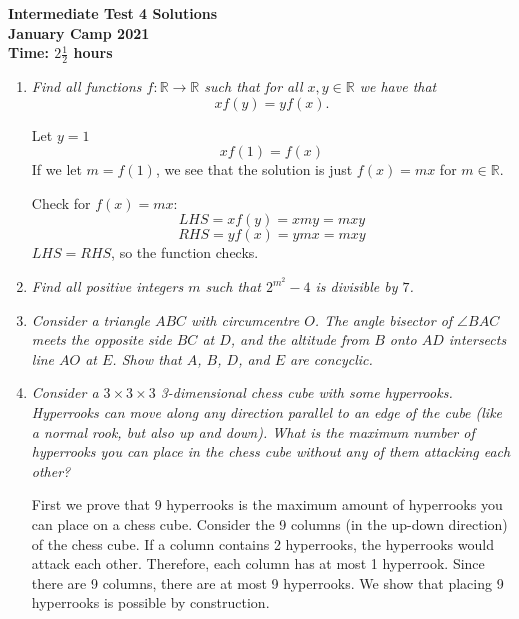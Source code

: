 \documentclass{article}
\begin{document}
\thispagestyle{empty}

\begin{center}
  \textbf{\Large Intermediate Test 4 Solutions}
  \\ \vspace{1em}
  \textbf{\large January Camp 2021}
  \\ \vspace{1em}
  \textbf{\large Time: $2\frac{1}{2}$ hours}
\end{center}

\vspace{24pt}

\begin{enumerate}[1.]

\item %
{\itshape Find all functions $f : \mathbb{R} \to \mathbb{R}$ such that for all $x, y \in \mathbb{R}$ we have that
\[ xf(y) = yf(x). \]}

Let $y = 1$ $$xf(1) = f(x)$$ If we let $m = f(1)$, we see that the solution is just $f(x) = mx$ for $m \in \mathbb{R}$.

Check for $f(x) = mx$:$$LHS = xf(y) = xmy = mxy$$ $$RHS = yf(x) = ymx = mxy$$ $LHS = RHS$, so the function checks.

\item %
{\itshape Find all positive integers $m$ such that $2^{m^2}-4$ is divisible by $7$.}


\item %
{\itshape Consider a triangle $ABC$ with circumcentre $O$.
The angle bisector of $\angle BAC$ meets the opposite side $BC$ at $D$, and the altitude from $B$ onto $AD$ intersects line $AO$ at $E$.
Show that $A$, $B$, $D$, and $E$ are concyclic.}


\item %
{\itshape Consider a $3\times3\times3$ 3-dimensional chess cube with some hyperrooks.
Hyperrooks can move along any direction parallel to an edge of the cube (like a normal rook, but also up and down).
What is the maximum number of hyperrooks you can place in the chess cube without any of them attacking each other?}

First we prove that 9 hyperrooks is the maximum amount of hyperrooks you can place on a chess cube. Consider the 9 columns (in the up-down direction) of the chess cube. If a column contains 2 hyperrooks, the hyperrooks would attack each other. Therefore, each column has at most 1 hyperrook. Since there are 9 columns, there are at most 9 hyperrooks. We show that placing 9 hyperrooks is possible by construction.


\end{enumerate}
\end{document}
